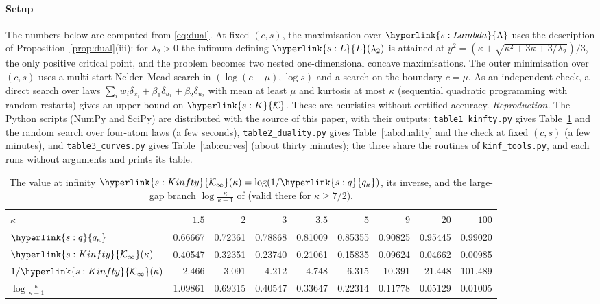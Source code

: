 \documentclass[11pt]{article}
\newcommand{\sy}[2]{{\hyperlink{#1}{#2}}}
\newcommand{\term}[2]{\hyperlink{#1}{#2}}
\newcommand{\Kc}{\sy{s:K}{\mathcal{K}}}
\newcommand{\Lam}{\sy{s:Lambda}{\Lambda}}
\newcommand{\Lw}{\sy{s:L}{L}}
\newcommand{\qk}{\sy{s:q}{q_{\kappa}}}
\newcommand{\Kinfty}{\sy{s:Kinfty}{\mathcal{K}_{\infty}}}
\begin{document}
\paragraph{Setup} The numbers below are computed from \eqref{eq:dual}. At fixed $(c,s)$, the maximisation over $\Lam$ uses
the description of Proposition~\ref{prop:dual}(iii): for $\lambda_2>0$ the infimum defining $\Lw(\lambda_2)$ is attained at
$y^2=(\kappa+\sqrt{\kappa^2+3\kappa+3/\lambda_2})/3$, the only positive critical point, and the problem becomes two nested
one-dimensional concave maximisations. The outer minimisation over $(c,s)$ uses a multi-start Nelder--Mead search in
$(\log(c-\mu),\log s)$ and a search on the boundary $c=\mu$. As an independent check, a direct search over \term{w:law}{laws}
$\sum_iw_i\delta_{x_i}+\beta_1\delta_{u_1}+\beta_2\delta_{u_2}$ with mean at least $\mu$ and kurtosis at most $\kappa$ (sequential quadratic
programming with random restarts) gives an upper bound on $\Kc$. These are heuristics without certified accuracy.
\emph{Reproduction.} The Python scripts (NumPy and SciPy) are distributed with the source of this paper, with their
outputs: \texttt{table1\_kinfty.py} gives Table~\ref{tab:kinfty} and the random search over four-atom \term{w:law}{laws} (a few
seconds), \texttt{table2\_duality.py} gives Table~\ref{tab:duality} and the check at fixed $(c,s)$ (a few minutes), and
\texttt{table3\_curves.py} gives Table~\ref{tab:curves} (about thirty minutes); the three share the routines of
\texttt{kinf\_tools.py}, and each runs without arguments and prints its table.

\begin{table}[t]
\centering
\small
\caption[The value at infinity]{The value at infinity $\Kinfty(\kappa)=\log(1/\qk)$, its inverse, and the large-gap branch
$\log\frac{\kappa}{\kappa-1}$ of \citet[Theorem~9]{L17} (valid there for $\kappa\ge7/2$).}\label{tab:kinfty}
\begin{tabular}{@{}lrrrrrrrr@{}}
\toprule
$\kappa$ & $1.5$ & $2$ & $3$ & $3.5$ & $5$ & $9$ & $20$ & $100$ \\
\midrule
$\qk$ & 0.66667 & 0.72361 & 0.78868 & 0.81009 & 0.85355 & 0.90825 & 0.95445 & 0.99020 \\
$\Kinfty(\kappa)$ & 0.40547 & 0.32351 & 0.23740 & 0.21061 & 0.15835 & 0.09624 & 0.04662 & 0.00985 \\
$1/\Kinfty(\kappa)$ & 2.466 & 3.091 & 4.212 & 4.748 & 6.315 & 10.391 & 21.448 & 101.489 \\
$\log\frac{\kappa}{\kappa-1}$ & 1.09861 & 0.69315 & 0.40547 & 0.33647 & 0.22314 & 0.11778 & 0.05129 & 0.01005 \\
\bottomrule
\end{tabular}
\end{table}
\end{document}
